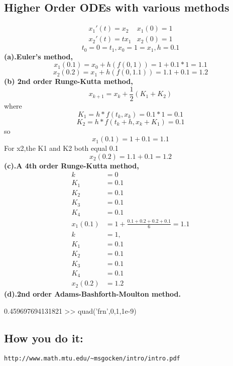 \subsection{Higher Order ODEs with various methods}
\[\begin{array}{cc}
    x_1'(t)=x_2 & x_1(0)=1 \\
    x_2'(t)=tx_1 & x_2(0)=1
\end{array}\]
\[t_0=0=t_1,x_0=1=x_1,h=0.1\]
\textbf{(a).Euler’s method,}
\[x_1(0.1)=x_0+h(f(0,1))=1+0.1*1=1.1\]
\[x_2(0.2)=x_1+h(f(0,1.1))=1.1+0.1=1.2\]
\textbf{(b) 2nd order Runge-Kutta method,}
\[x_{k+1}=x_k+\frac{1}{2}(K_1+K_2)\]
where
\[K_1=h*f(t_k,x_k)=0.1*1=0.1\]\[K_2=h*f(t_k+h,x_k+K_1)=0.1\]so
\[x_1(0.1)=1+0.1=1.1\]For x2,the K1 and K2 both equal 0.1\[x_2(0.2)=1.1+0.1=1.2\]
\textbf{(c).A 4th order Runge-Kutta method,}
\begin{align*}
    k&=0\\
    K_1&=0.1\\
    K_2&=0.1\\
    K_3&=0.1\\
    K_4&=0.1\\
    x_1(0.1)&=1+\frac{0.1+0.2+0.2+0.1}{6}=1.1\\
    k&=1,\\
    K_1&=0.1\\
    K_2&=0.1\\
    K_3&=0.1\\
    K_4&=0.1\\
    x_2(0.2)&=1.2
\end{align*}
\textbf{(d).2nd order Adams-Bashforth-Moulton method.}

   0.459697694131821
>> quad('frn',0,1,1e-9)

\def\eeq{\end{equation}}
\newcommand{\abs}[1]{\left| #1 \right|}
\def\beqn{\begin{eqnarray*}}
\def\eeqn{\end{eqnarray*}}

%
\subsection*{How you do it:}

\verb+http://www.math.mtu.edu/~msgocken/intro/intro.pdf+

